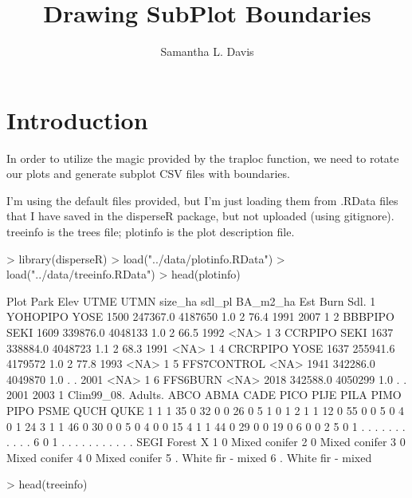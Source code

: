 \documentclass{article}
\begin{document}


\title{Drawing SubPlot Boundaries}
\author{Samantha L. Davis}

\section{Introduction}

In order to utilize the magic provided by the traploc function, we need to rotate our plots and generate subplot CSV files with boundaries.

I'm using the default files provided, but I'm just loading them from .RData files that  I have saved in the disperseR package, but not uploaded (using gitignore). treeinfo is the trees file; plotinfo is the plot description file.
\begin{Schunk}
\begin{Sinput}
> library(disperseR)
> load("../data/plotinfo.RData")
> load("../data/treeinfo.RData")
> head(plotinfo)
\end{Sinput}
\begin{Soutput}
         Plot Park Elev     UTME    UTMN size_ha sdl_pl BA_m2_ha  Est Burn Sdl.
1    YOHOPIPO YOSE 1500 247367.0 4187650     1.0      2     76.4 1991 2007    1
2     BBBPIPO SEKI 1609 339876.0 4048133     1.0      2     66.5 1992 <NA>    1
3     CCRPIPO SEKI 1637 338884.0 4048723     1.1      2     68.3 1991 <NA>    1
4    CRCRPIPO YOSE 1637 255941.6 4179572     1.0      2     77.8 1993 <NA>    1
5 FFS7CONTROL <NA> 1941 342286.0 4049870     1.0      .        . 2001 <NA>    1
6    FFS6BURN <NA> 2018 342588.0 4050299     1.0      .        . 2001 2003    1
  Clim99_08. Adults. ABCO ABMA CADE PICO PIJE PILA PIMO PIPO PSME QUCH QUKE
1          1       1   35    0   32    0    0   26    0    5    1    0    1
2          1       1   12    0   55    0    0    5    0    4    0    1   24
3          1       1   46    0   30    0    0    5    0    4    0    0   15
4          1       1   44    0   29    0    0   19    0    6    0    0    2
5          0       1    .    .    .    .    .    .    .    .    .    .    .
6          0       1    .    .    .    .    .    .    .    .    .    .    .
  SEGI            Forest X
1    0     Mixed conifer  
2    0     Mixed conifer  
3    0     Mixed conifer  
4    0     Mixed conifer  
5    . White fir - mixed  
6    . White fir - mixed  
\end{Soutput}
\begin{Sinput}
> head(treeinfo)
\end{Sinput}

\end{Schunk}
\end{document}
